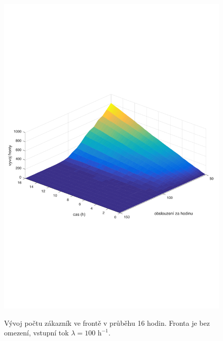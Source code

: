 \documentclass[a4paper,12pt]{article}
\begin{document}
\begin{figure}
\centering
\includegraphics[width=0.8\columnwidth]{fronta.pdf}
\label{fig:fronta}
\caption{Vývoj počtu zákazník ve frontě v průběhu 16 hodin. Fronta je bez omezení, vstupní tok \(\lambda = 100 \mbox{~h}^{-1}\). }
\end{figure}
\end{document}
